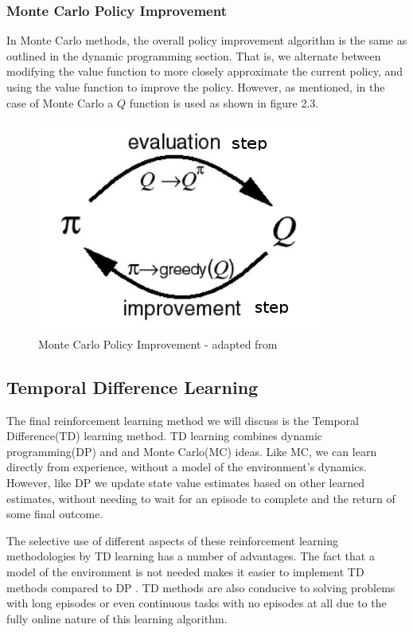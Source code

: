 \subsubsection{Monte Carlo Policy Improvement}
In Monte Carlo methods, the overall policy improvement algorithm is the same as outlined in the dynamic
programming section.
That is, we alternate between modifying the value function to more closely approximate the current policy,
and using the value function to improve the policy.
However, as mentioned, in the case of Monte Carlo a $Q$ function is used as shown in figure 2.3.
\begin{figure}[ht]
    \includegraphics[scale=.5]{images/MC_control.png}
    \caption{Monte Carlo Policy Improvement - adapted from\citep{lee2005mccontrol}}
\end{figure}

\subsection{Temporal Difference Learning}\label{subsec:td}
The final reinforcement learning method we will discuss is the Temporal Difference(TD) learning method.
TD learning combines dynamic programming(DP) and and Monte Carlo(MC) ideas\citep{sutton1998reinforcement}.
Like MC, we can learn directly from experience, without a model of the environment's dynamics.
However, like DP we update state value estimates based on other learned estimates, without needing to wait for an
episode to complete and the return of some final outcome.

The selective use of different aspects of these reinforcement learning methodologies by TD learning has
a number of advantages.
The fact that a model of the environment is not needed makes it easier to implement TD methods
compared to DP .
TD methods are also conducive to solving problems with long episodes or even continuous tasks with no
episodes at all due to the fully online nature of this learning algorithm.

